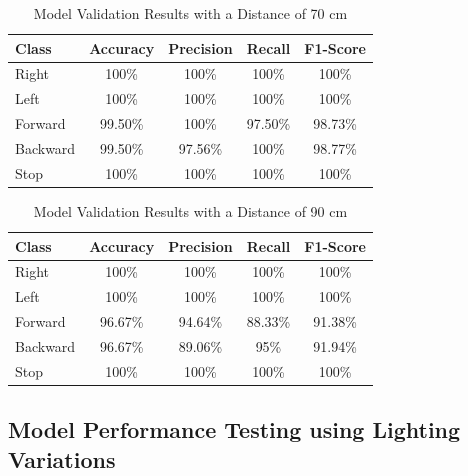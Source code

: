 \begin{table}[H]
  \caption{Model Validation Results with a Distance of 70 cm}
  \label{tb:70cm}
  \centering
  \begin{tabular}{|l|c|c|c|c|}
  \hline
  \rowcolor[HTML]{C0C0C0} 
  \textbf{Class} & \textbf{Accuracy} & \textbf{Precision} & \textbf{Recall} & \textbf{F1-Score} \\ \hline
  Right    & 100\%            & 100\%             & 100\%           & 100\%            \\ \hline
  Left     & 100\%          & 100\%           & 100\%           & 100\%           \\ \hline
  Forward      & 99.50\%          & 100\%           & 97.50\%          & 98.73\%          \\ \hline
  Backward     & 99.50\%            & 97.56\%             & 100\%           & 98.77\%            \\ \hline
  Stop  & 100\%            & 100\%             & 100\%           & 100\%            \\ \hline
  \end{tabular}
\end{table}

\begin{table}[H]
  \caption{Model Validation Results with a Distance of 90 cm}
  \label{tb:90cm}
  \centering
  \begin{tabular}{|l|c|c|c|c|}
  \hline
  \rowcolor[HTML]{C0C0C0} 
  \textbf{Class} & \textbf{Accuracy} & \textbf{Precision} & \textbf{Recall} & \textbf{F1-Score} \\ \hline
  Right    & 100\%            & 100\%             & 100\%           & 100\%            \\ \hline
  Left     & 100\%          & 100\%           & 100\%           & 100\%           \\ \hline
  Forward      & 96.67\%          & 94.64\%           & 88.33\%          & 91.38\%          \\ \hline
  Backward     & 96.67\%            & 89.06\%             & 95\%           & 91.94\%            \\ \hline
  Stop  & 100\%            & 100\%             & 100\%           & 100\%            \\ \hline
  \end{tabular}
\end{table}
    
\subsection{Model Performance Testing using Lighting Variations}

